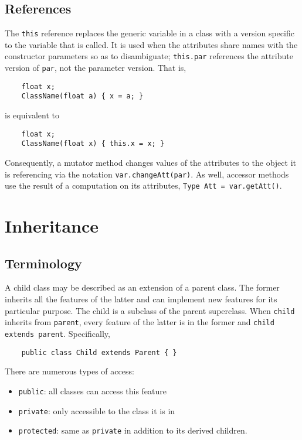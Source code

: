\documentclass[letterpaper, openany, justified]{tufte-book}
\newcommand{\cd}[1]{\lstinline{#1}}
\begin{document}
\begin{fullwidth}
\section{References}
The \cd{this} reference replaces the generic variable in a class with a version specific to the variable that is called. It is used when the attributes share names with the constructor parameters so as to disambiguate; \cd{this.par} references the attribute version of \cd{par}, not the parameter version. That is,
\begin{lstlisting}
    float x;
    ClassName(float a) { x = a; }
\end{lstlisting}
is equivalent to
\begin{lstlisting}
    float x;
    ClassName(float x) { this.x = x; }
\end{lstlisting}
Consequently, a mutator method changes values of the attributes to the object it is referencing via the notation \cd{var.changeAtt(par)}. As well, accessor methods use the result of a computation on its attributes, \cd{Type Att = var.getAtt()}.

\chapter{Inheritance}

\section{Terminology}
A child class may be described as an extension of a parent class. The former inherits all the features of the latter and can implement new features for its particular purpose. The child is a subclass of the parent superclass. When \cd{child} inherits from \cd{parent}, every feature of the latter is in the former and \cd{child extends parent}. Specifically,
\begin{lstlisting}
    public class Child extends Parent { }
\end{lstlisting}
There are numerous types of access:
\begin{itemize}
    \item \cd{public}: all classes can access this feature
    \item \cd{private}: only accessible to the class it is in
    \item \cd{protected}: same as \cd{private} in addition to its derived children.
\end{itemize}


\end{fullwidth}
\end{document}
